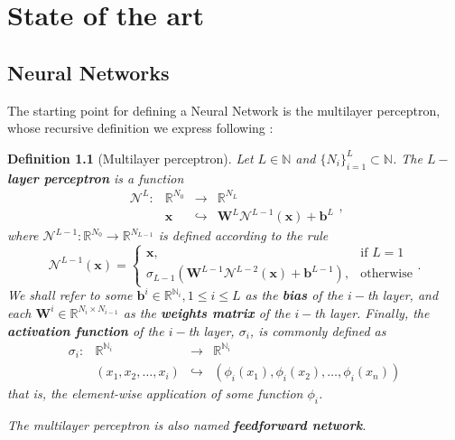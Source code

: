 \documentclass[12pt]{report} %
\newtheorem{definition}{Definition}
\newcommand{\tmmathbf}[1]{\ensuremath{\boldsymbol{#1}}}
\begin{document}
\chapter{State of the art}
\section{Neural Networks} \label{sec-neural-networks}
The starting point for defining a Neural Network is the multilayer perceptron, whose recursive definition we express following \cite{lu2021deepxde}:
\begin{definition}[Multilayer perceptron]
  Let \(L \in \mathbb{N}\) and \(\{ N_i \}_{i = 1}^L \subset \mathbb{N}\). The
    {\textbf{$L-$layer perceptron}} is a function
  \begin{equation}
    \begin{array}{llll}
      \mathcal{N}^L : & \mathbb{R}^{N_0} & \rightarrow     & \mathbb{R}^{N_L}                   \\
                      & \tmmathbf{x}     & \hookrightarrow & \tmmathbf{W}^L \mathcal{N}^{L - 1}
      (\tmmathbf{x}) +\tmmathbf{b}^L
    \end{array},
    \label{perceptronRule}
  \end{equation}
  where \(\mathcal{N}^{L - 1} : \mathbb{R}^{N_0} \rightarrow \mathbb{R}^{N_{L- 1}}\) is defined according to the rule
  \[ \mathcal{N}^{L - 1} (\tmmathbf{x}) = \left\{\begin{array}{ll}
      \tmmathbf{x},           & \text{if } L = 1 \\
      \sigma_{L - 1} (\tmmathbf{W}^{L - 1} \mathcal{N}^{L - 2} (\tmmathbf{x})
      +\tmmathbf{b}^{L - 1}), & \text{otherwise}
    \end{array}\right. . \]
  We shall refer to some \(\tmmathbf{b}^i \in \mathbb{R}^{\mathbb{N}_i}, 1 \leq i \leq L\) as the {\textbf{bias}} of the \(i -\)th layer, and each
  \(\tmmathbf{W}^i \in \mathbb{R}^{N_i \times N_{i - 1}}\) as the
  \textbf{weights matrix} of the \(i -\)th layer. Finally, the \textbf{activation function} of the $i
    -$th layer, \(\sigma_i\), is commonly defined as
  \[ \begin{array}{cccc}
      \sigma_i : & \mathbb{R}^{\mathbb{N}_i} & \rightarrow     &
      \mathbb{R}^{\mathbb{N}_i}                                                               \\
                 & (x_1, x_2, \ldots, x_i)   & \hookrightarrow & (\phi_i (x_1), \phi_i (x_2),
      \ldots, \phi_i (x_n))
    \end{array} \]
  that is, the element-wise application of some function
  $\phi_i$.

  The multilayer perceptron is also named \textbf{feedforward network}.
\end{definition}
\end{document}
